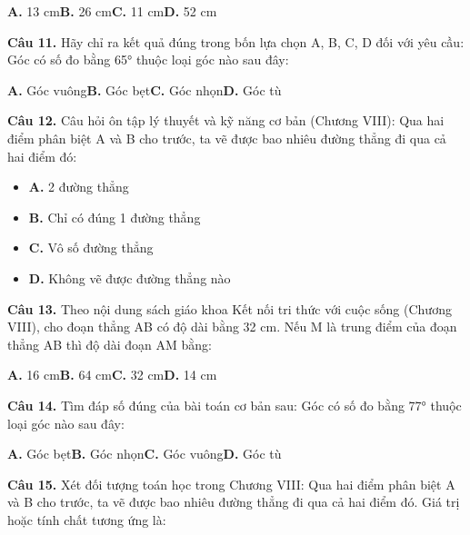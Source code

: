 \documentclass[11pt,a4paper]{article}
\begin{document}
\hspace*{1.5em}\textbf{A.} 13 cm\quad\quad \textbf{B.} 26 cm\quad\quad \textbf{C.} 11 cm\quad\quad \textbf{D.} 52 cm\par\vspace{2pt}
\textbf{\color{primary} Câu 11.} Hãy chỉ ra kết quả đúng trong bốn lựa chọn A, B, C, D đối với yêu cầu: Góc có số đo bằng 65° thuộc loại góc nào sau đây:\par
\hspace*{1.5em}\textbf{A.} Góc vuông\quad\quad \textbf{B.} Góc bẹt\quad\quad \textbf{C.} Góc nhọn\quad\quad \textbf{D.} Góc tù\par\vspace{2pt}
\textbf{\color{primary} Câu 12.} Câu hỏi ôn tập lý thuyết và kỹ năng cơ bản (Chương VIII): Qua hai điểm phân biệt A và B cho trước, ta vẽ được bao nhiêu đường thẳng đi qua cả hai điểm đó:\par
\begin{itemize}\setlength{\itemsep}{1pt}\setlength{\parskip}{0pt}
  \item[] \textbf{A.} 2 đường thẳng
  \item[] \textbf{B.} Chỉ có đúng 1 đường thẳng
  \item[] \textbf{C.} Vô số đường thẳng
  \item[] \textbf{D.} Không vẽ được đường thẳng nào
\end{itemize}\vspace{2pt}
\textbf{\color{primary} Câu 13.} Theo nội dung sách giáo khoa Kết nối tri thức với cuộc sống (Chương VIII), cho đoạn thẳng AB có độ dài bằng 32 cm. Nếu M là trung điểm của đoạn thẳng AB thì độ dài đoạn AM bằng:\par
\hspace*{1.5em}\textbf{A.} 16 cm\quad\quad \textbf{B.} 64 cm\quad\quad \textbf{C.} 32 cm\quad\quad \textbf{D.} 14 cm\par\vspace{2pt}
\textbf{\color{primary} Câu 14.} Tìm đáp số đúng của bài toán cơ bản sau: Góc có số đo bằng 77° thuộc loại góc nào sau đây:\par
\hspace*{1.5em}\textbf{A.} Góc bẹt\quad\quad \textbf{B.} Góc nhọn\quad\quad \textbf{C.} Góc vuông\quad\quad \textbf{D.} Góc tù\par\vspace{2pt}
\textbf{\color{primary} Câu 15.} Xét đối tượng toán học trong Chương VIII: Qua hai điểm phân biệt A và B cho trước, ta vẽ được bao nhiêu đường thẳng đi qua cả hai điểm đó. Giá trị hoặc tính chất tương ứng là:\par
\end{document}
